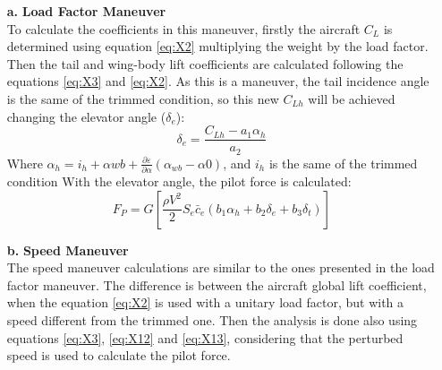\begin{itemize}
    \item[\textbf{a.}] \textbf{Load Factor Maneuver}\\
    To calculate the coefficients in this maneuver, firstly the aircraft $C_{L}$ is determined using equation \ref{eq:X2} multiplying the weight by the load factor. Then the tail and wing-body lift coefficients are calculated following the equations \ref{eq:X3} and \ref{eq:X2}.
    As this is a maneuver, the tail incidence angle is the same of the trimmed condition, so this new $C_{Lh}$ will be achieved changing the elevator angle ($\delta_{e}$):
    \begin{equation}
        \delta_{e}=\frac{C_{Lh}-a_{1} \alpha_{h}}{a_{2}}
        \label{eq:X12}
    \end{equation}
    Where $\alpha_{h}=i_{h}+\alpha{wb}+\frac{\partial\varepsilon}{\partial\alpha}(\alpha_{wb}-\alpha{0})$, and $i_{h}$ is the same of the trimmed condition
    With the elevator angle, the pilot force is calculated:
    \begin{equation}
        F_{P}=G[\frac{\rho V^{2}}{2}S_{e}\bar{c}_{e}(b_{1}\alpha_{h}+b_{2}\delta_{e}+b_{3}\delta_{t})]
        \label{eq:X13}
    \end{equation}
    \item[\textbf{b.}] \textbf{Speed Maneuver}\\
    The speed maneuver calculations are similar to the ones presented in the load factor maneuver. The difference is between the aircraft global lift coefficient, when the equation \ref{eq:X2} is used with a unitary load factor, but with a speed different from the trimmed one.
    Then the analysis is done also using equations \ref{eq:X3}, \ref{eq:X12} and \ref{eq:X13}, considering that the perturbed speed is used to calculate the pilot force.
    
    
\end{itemize} 